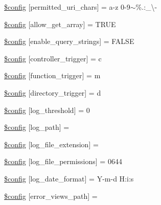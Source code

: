 \begin{DoxyCompactItemize}
\hyperlink{config_8php_a0f3f7fc5dfe7ae9b96622df2858a6c5b}{\$config} \mbox{[}\textquotesingle{}permitted\+\_\+uri\+\_\+chars\textquotesingle{}\mbox{]} = \textquotesingle{}a-\/z 0-\/9$\sim$\%.\+:\+\_\+\textbackslash{}-\/\textquotesingle{}
\item 
\hyperlink{config_8php_ad899b5e4fb9873f8afcc93e4c788e11c}{\$config} \mbox{[}\textquotesingle{}allow\+\_\+get\+\_\+array\textquotesingle{}\mbox{]} = T\+R\+UE
\item 
\hyperlink{config_8php_ae0af4957b94a8e97908013d8a34b2d58}{\$config} \mbox{[}\textquotesingle{}enable\+\_\+query\+\_\+strings\textquotesingle{}\mbox{]} = F\+A\+L\+SE
\item 
\hyperlink{config_8php_af1ca04d83f60b351122bdcc8933df731}{\$config} \mbox{[}\textquotesingle{}controller\+\_\+trigger\textquotesingle{}\mbox{]} = \textquotesingle{}c\textquotesingle{}
\item 
\hyperlink{config_8php_aed9f24c6600958d9d55acc35c1a2fbfb}{\$config} \mbox{[}\textquotesingle{}function\+\_\+trigger\textquotesingle{}\mbox{]} = \textquotesingle{}m\textquotesingle{}
\item 
\hyperlink{config_8php_aca523de0098516b35bc5fa68ce13962f}{\$config} \mbox{[}\textquotesingle{}directory\+\_\+trigger\textquotesingle{}\mbox{]} = \textquotesingle{}d\textquotesingle{}
\item 
\hyperlink{config_8php_a1a167c2cf5bc9b35df3e8b47957dfe33}{\$config} \mbox{[}\textquotesingle{}log\+\_\+threshold\textquotesingle{}\mbox{]} = 0
\item 
\hyperlink{config_8php_a992a95ce2e2dc83a6a443d4828ea49f8}{\$config} \mbox{[}\textquotesingle{}log\+\_\+path\textquotesingle{}\mbox{]} = \textquotesingle{}\textquotesingle{}
\item 
\hyperlink{config_8php_a5dc1bfe6bafc81ab1f5fc8f5b2b3bc0c}{\$config} \mbox{[}\textquotesingle{}log\+\_\+file\+\_\+extension\textquotesingle{}\mbox{]} = \textquotesingle{}\textquotesingle{}
\item 
\hyperlink{config_8php_a2f0158b0ecb2c39e093957526953346a}{\$config} \mbox{[}\textquotesingle{}log\+\_\+file\+\_\+permissions\textquotesingle{}\mbox{]} = 0644
\item 
\hyperlink{config_8php_ae9f524e834e4d05f0e30aed5edb33e2c}{\$config} \mbox{[}\textquotesingle{}log\+\_\+date\+\_\+format\textquotesingle{}\mbox{]} = \textquotesingle{}Y-\/m-\/d H\+:i\+:s\textquotesingle{}
\item 
\hyperlink{config_8php_a7c49f60eb08b8ebddb5e5af1d02b2b72}{\$config} \mbox{[}\textquotesingle{}error\+\_\+views\+\_\+path\textquotesingle{}\mbox{]} = \textquotesingle{}\textquotesingle{}

\end{DoxyCompactItemize}
